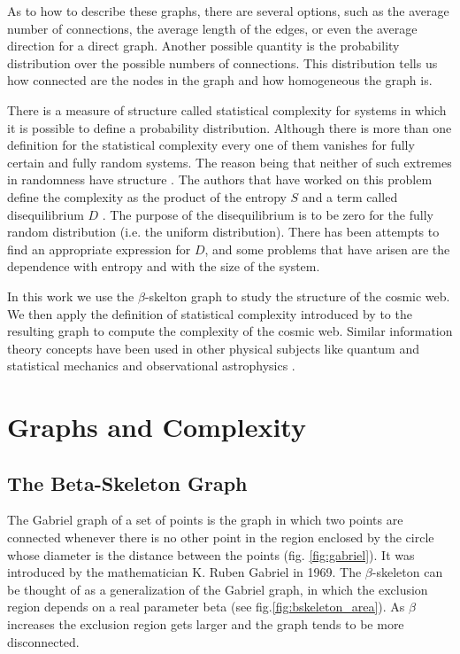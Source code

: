 \documentclass[fleqn,usenatbib]{mnras}
\begin{document}
As to how to describe these graphs, there are several options, such as
the average number of connections, the average length of the edges, or
even the average direction for a direct graph. Another possible
quantity is the probability distribution over the possible numbers of
connections. This distribution tells us how connected are the nodes in
the graph and how homogeneous the graph is.

There is a measure of structure called statistical complexity for
systems in which it is possible to define a probability
distribution. Although there is more than one definition for the
statistical complexity every one of them vanishes for fully certain
and fully random systems. The reason being that neither of such
extremes in randomness have structure \cite{grassberg}
\cite{HUBERMAN1986376}. The authors that have worked on this problem
define the complexity as the product of the entropy $S$ and a term
called disequilibrium $D$ \cite{lopez_comp}. The purpose of the
disequilibrium is to be zero for the fully random distribution
(i.e. the uniform distribution). There has been attempts to find an
appropriate expression for $D$, and some problems that have arisen are
the dependence with entropy and with the size of the system.

In this work we use the $\beta$-skelton graph to study the structure
of the cosmic web. We then apply the definition of statistical
complexity introduced by \cite{sig_com} to the resulting graph to
compute the complexity of the cosmic web. Similar information theory
concepts have been used in other physical subjects like quantum and
statistical mechanics \cite{comp_quantum} and observational
astrophysics \cite{comp_astro}.   

\section{Graphs and Complexity}

\subsection{The Beta-Skeleton Graph}

The Gabriel graph of a set of points is the graph in which two points
are connected whenever there is no other point in the region enclosed
by the circle whose diameter is the distance between the points
(fig. \ref{fig:gabriel}).   
It was introduced by the mathematician K. Ruben Gabriel in 1969. 
The $\beta$-skeleton can be thought of as a generalization of the
Gabriel graph, in which the exclusion region depends on a real
parameter beta (see fig.\ref{fig:bskeleton_area}).   
As $\beta$ increases the exclusion  region gets larger and the graph tends to be
more disconnected.  
\end{document}
